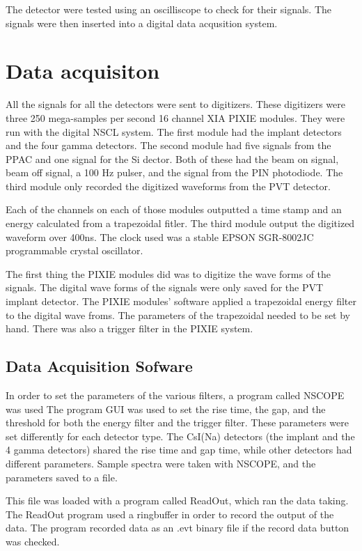 The detector were tested using an oscilliscope to check for their signals.
The signals were then inserted into a digital data acqusition system.

\section{Data acquisiton}

All the signals for all the detectors were sent to digitizers.
These digitizers were three 250 mega-samples per second 16 channel XIA PIXIE modules. 
They were run with the digital NSCL system.
The first module had the implant detectors and the four gamma detectors. 
The second module had five signals from the PPAC and one signal for the Si dector. 
Both of these had the beam on signal, beam off signal, a 100 Hz pulser, and the signal from the PIN photodiode. 
The third module only recorded the digitized waveforms from the PVT detector.

Each of the channels on each of those modules outputted a time stamp and an energy calculated from a trapezoidal fitler.
The third module output the digitized waveform over 400ns.
The clock used was a stable EPSON SGR-8002JC programmable crystal oscillator.

The first thing the PIXIE modules did was to digitize the wave forms of the signals.
The digital wave forms of the signals were only saved for the PVT implant detector.
The PIXIE modules' software applied a trapezoidal energy filter to the digital wave froms.
The parameters of the trapezoidal needed to be set by hand.
There was also a trigger filter in the PIXIE system.

\subsection{Data Acquisition Sofware}
In order to set the parameters of the various filters, a program called NSCOPE was used \cite{REFHERE}
The program GUI was used to set the rise time, the gap, and the threshold for both the energy filter and the trigger filter.
These parameters were set differently for each detector type.
The CsI(Na) detectors (the implant and the 4 gamma detectors) shared the rise time and gap time, while other detectors had different parameters.
Sample spectra were taken with NSCOPE, and the parameters saved to a file.

This file was loaded with a program called ReadOut, which ran the data taking.
The ReadOut program used a ringbuffer in order to record the output of the data.
The program recorded data as an .evt binary file if the record data button was checked.


